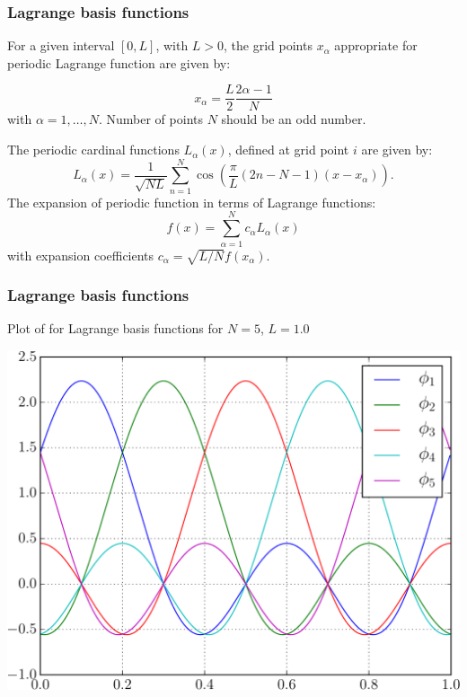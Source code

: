 \documentclass[10pt,t]{beamer}
\begin{document}
\begin{frame}
\frametitle{Lagrange basis functions}

For a given interval $[0,L]$, with $L>0$, the grid points $x_{\alpha}$
appropriate for periodic Lagrange function are given by:

\begin{equation}
x_{\alpha}=\frac{L}{2}\frac{2\alpha-1}{N}
\end{equation}
with $\alpha=1,\ldots,N$. Number of points $N$ should be an odd number.

The periodic cardinal functions $L_{\alpha}(x)$, defined
at grid point $i$ are given by:
\begin{equation}
L_{\alpha}(x)=\frac{1}{\sqrt{NL}}\sum_{n=1}^{N}\cos\left(\frac{\pi}{L}(2n-N-1)(x-x_{\alpha})\right).
\end{equation}
The expansion of periodic function in terms of Lagrange functions:
\begin{equation}
f(x)=\sum_{\alpha=1}^{N}c_{\alpha}L_{\alpha}(x)
\end{equation}
with expansion coefficients $c_{\alpha}=\sqrt{L/N}f(x_{\alpha})$.

\end{frame}


\begin{frame}
\frametitle{Lagrange basis functions}

Plot of for Lagrange basis functions for $N = 5$, $L = 1.0$

{\centering
\includegraphics[scale=0.5]{images/plot_LF_p_N_5.pdf}
\par}

\end{frame}
\end{document}
